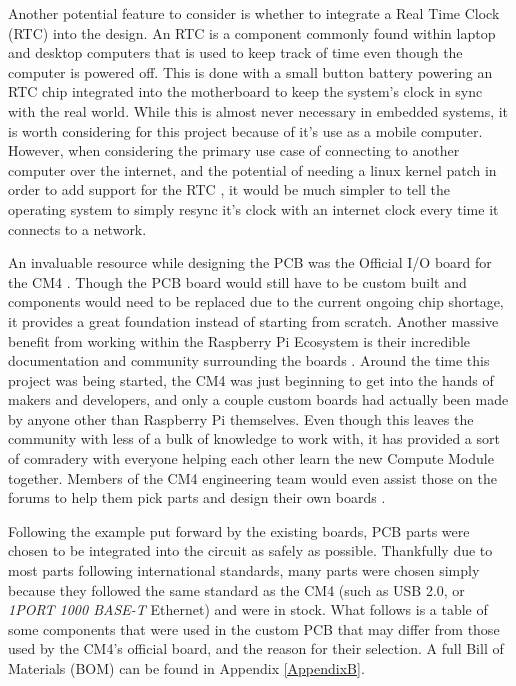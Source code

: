Another potential feature to consider is whether to integrate a Real Time Clock (RTC) into the design.
An RTC is a component commonly found within laptop and desktop computers that is used to keep track of time even though the computer is powered off.
This is done with a small button battery powering an RTC chip integrated into the motherboard to keep the system's clock in sync with the real world.
While this is almost never necessary in embedded systems, it is worth considering for this project because of it's use as a mobile computer.
However, when considering the primary use case of connecting to another computer over the internet, and the potential of needing a linux kernel patch in order to add support for the RTC \cite{rtc_kernelpatch}, it would be much simpler to tell the operating system to simply resync it's clock with an internet clock every time it connects to a network.

An invaluable resource while designing the PCB was the Official I/O board for the CM4 \cite{rpi_cm4_io}.
Though the PCB board would still have to be custom built and components would need to be replaced due to the current ongoing chip shortage, it provides a great foundation instead of starting from scratch.
Another massive benefit from working within the Raspberry Pi Ecosystem is their incredible documentation and community surrounding the boards \cite{rpi_cm4_docs}.
Around the time this project was being started, the CM4 was just beginning to get into the hands of makers and developers, and only a couple custom boards had actually been made by anyone other than Raspberry Pi themselves.
Even though this leaves the community with less of a bulk of knowledge to work with, it has provided a sort of comradery with everyone helping each other learn the new Compute Module together.
Members of the CM4 engineering team would even assist those on the forums to help them pick parts and design their own boards \cite{cm4_datasheet_problem,rtc_kernelpatch}.

Following the example put forward by the existing boards, PCB parts were chosen to be integrated into the circuit as safely as possible.
Thankfully due to most parts following international standards, many parts were chosen simply because they followed the same standard as the CM4 (such as USB 2.0, or \emph{1PORT 1000 BASE-T} Ethernet) and were in stock.
What follows is a table of some components that were used in the custom PCB that may differ from those used by the CM4's official board, and the reason for their selection.
A full Bill of Materials (BOM) can be found in Appendix \ref{AppendixB}.

